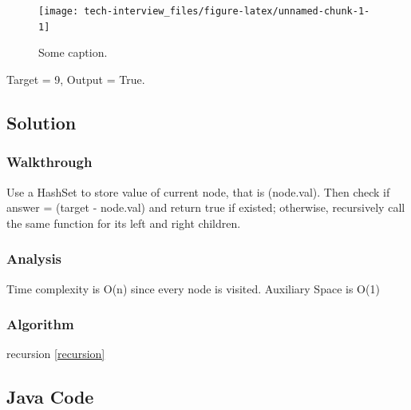 \documentclass[]{book}
\begin{document}
\begin{figure}
\texttt{[image: tech-interview\_files/figure-latex/unnamed-chunk-1-1]} \caption{Some caption.}\label{fig:unnamed-chunk-1}
\end{figure}

Target = 9, Output = True.

\hypertarget{solution-2}{%
\subsection{Solution}\label{solution-2}}

\hypertarget{walkthrough-4}{%
\subsubsection{Walkthrough}\label{walkthrough-4}}

Use a HashSet to store value of current node, that is (node.val). Then check if answer = (target - node.val)
and return true if existed; otherwise, recursively call the same function for its left and right children.

\hypertarget{analysis-4}{%
\subsubsection{Analysis}\label{analysis-4}}

Time complexity is O(n) since every node is visited. Auxiliary Space is O(1)

\hypertarget{algorithm-4}{%
\subsubsection{Algorithm}\label{algorithm-4}}

recursion \ref{recursion}

\hypertarget{java-code-2}{%
\subsection{Java Code}\label{java-code-2}}
\end{document}
